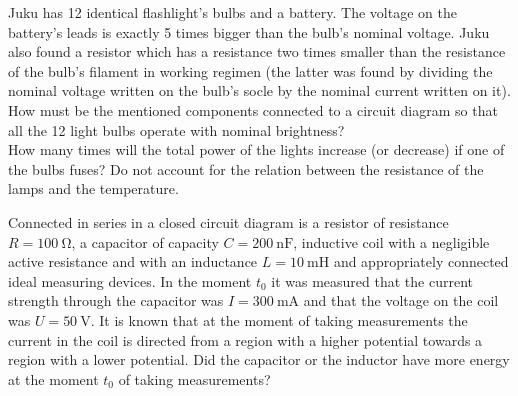 \documentclass[11pt]{article}
\begin{document}

\probeng
Juku has 12 identical flashlight’s bulbs and a battery. The voltage on the battery’s leads is exactly 5 times bigger than the bulb’s nominal voltage. Juku also found a resistor which has a resistance two times smaller than the resistance of the bulb’s filament in working regimen (the latter was found by dividing the nominal voltage written on the bulb’s socle by the nominal current written on it).\\
\osa How must be the mentioned components connected to a circuit diagram so that all the 12 light bulbs operate with nominal brightness?\\
\osa How many times will the total power of the lights increase (or decrease) if one of the bulbs fuses? Do not account for the relation between the resistance of the lamps and the temperature.
\probend
\bigskip


\probeng
Connected in series in a closed circuit diagram is a resistor of resistance $R=\SI{100}{\ohm}$, a capacitor of capacity $C=\SI{200}{\nano\farad}$, inductive coil with a negligible active resistance and with an inductance $L=\SI{10}{\milli\henry}$ and appropriately connected ideal measuring devices. In the moment $t_0$ it was measured that the current strength through the capacitor was $I=\SI{300}{\milli\ampere}$ and that the voltage on the coil was $U=\SI{50}{\volt}$. It is known that at the moment of taking measurements the current in the coil is directed from a region with a higher potential towards a region with a lower potential. Did the capacitor or the inductor have more energy at the moment $t_0$ of taking measurements?
\probend
\bigskip

\end{document}
